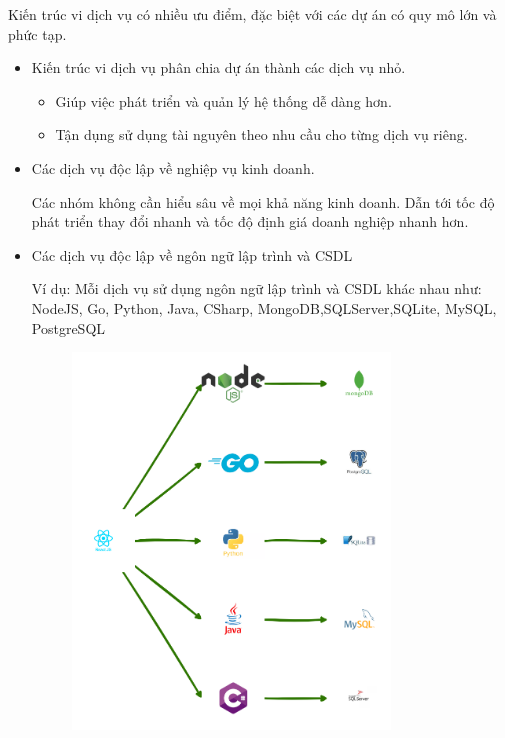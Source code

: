 Kiến trúc vi dịch vụ có nhiều ưu điểm, đặc biệt với các dự án có quy mô lớn và phức tạp.

\begin{itemize}

    \item Kiến trúc vi dịch vụ phân chia dự án thành các dịch vụ nhỏ.

          \begin{itemize}

              \item Giúp việc phát triển và quản lý hệ thống dễ dàng hơn.

              \item Tận dụng sử dụng tài nguyên theo nhu cầu cho từng dịch vụ riêng.

          \end{itemize}

    \item Các dịch vụ độc lập về nghiệp vụ kinh doanh.

          Các nhóm không cần hiểu sâu về mọi khả năng kinh doanh. Dẫn tới tốc độ phát triển thay đổi nhanh và tốc độ định giá doanh nghiệp nhanh hơn.

    \item Các dịch vụ độc lập về ngôn ngữ lập trình và CSDL

          Ví dụ: Mỗi dịch vụ sử dụng ngôn ngữ lập trình và CSDL khác nhau như: NodeJS, Go, Python, Java, CSharp, MongoDB,SQLServer,SQLite, MySQL, PostgreSQL

          \begin{figure}[h]

              \centering

              \includegraphics[height = 10cm]{pictures/DaNgonNguVaCSDL/main.drawio.png}


\end{figure}
\end{itemize}
